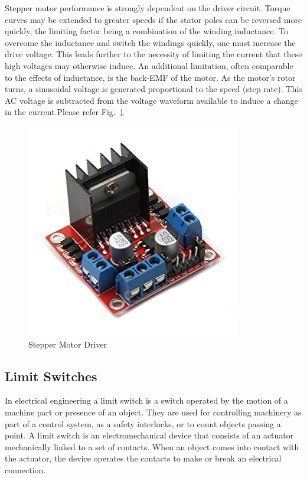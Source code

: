 \documentclass[MTech]{iitmdiss}
\begin{document}
Stepper motor performance is strongly dependent on the driver circuit. Torque curves may be extended to greater speeds if the stator poles can be reversed more quickly, the limiting factor being a combination of the winding inductance. To overcome the inductance and switch the windings quickly, one must increase the drive voltage. This leads further to the necessity of limiting the current that these high voltages may otherwise induce. An additional limitation, often comparable to the effects of inductance, is the back-EMF of the motor. As the motor's rotor turns, a sinusoidal voltage is generated proportional to the speed (step rate). This AC voltage is subtracted from the voltage waveform available to induce a change in the current.Please refer Fig.~\ref{fig:driv}

\begin{figure}
	\includegraphics[scale = 0.5]{ffigures/driver}
	\centering
	\caption{Stepper Motor Driver}
	\label{fig:driv}
	
\end{figure}

\subsection{Limit Switches}

In electrical engineering a limit switch is a switch operated by the motion of a machine part or presence of an object. They are used for controlling machinery as part of a control system, as a safety interlocks, or to count objects passing a point. A limit switch is an electromechanical device that consists of an actuator mechanically linked to a set of contacts. When an object comes into contact with the actuator, the device operates the contacts to make or break an electrical connection.
\end{document}
